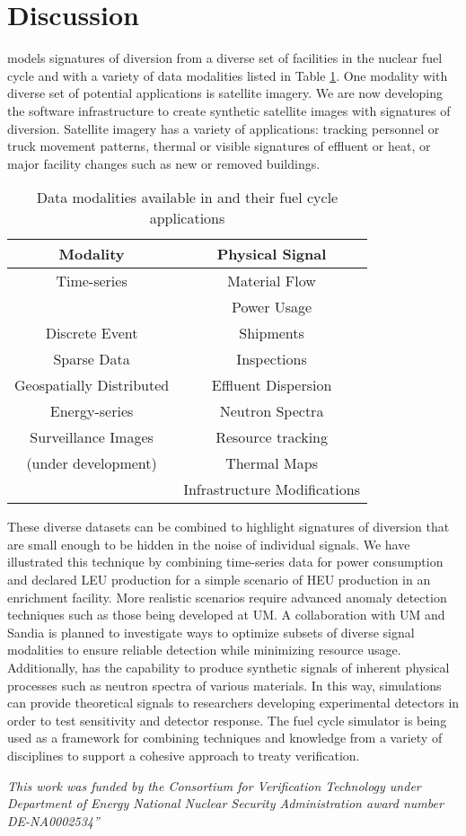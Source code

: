 \section{Discussion}
\label{s_dis}

\Cyclus models signatures of diversion from a diverse set of facilities in the nuclear fuel cycle and with a variety of data modalities listed in  Table \ref{tab:modalities}.  One modality with diverse set of potential applications is satellite imagery.  We are now developing the software infrastructure to create synthetic satellite images with signatures of diversion. Satellite imagery has a variety of applications: tracking personnel or truck movement patterns, thermal or visible signatures of effluent or heat, or major facility changes such as new or removed buildings.

\begin{table}
\centering
\begin{tabular}{|c|c|}
\hline
\textbf{Modality}        & \textbf{Physical Signal} \\
\hline
Time-series              & Material Flow \\
                         & Power Usage \\
\hline
Discrete Event           & Shipments \\
\hline
Sparse Data              & Inspections \\
\hline
Geospatially Distributed & Effluent Dispersion  \\
\hline
Energy-series            & Neutron Spectra \\
\hline
Surveillance Images      & Resource tracking \\
(under development)      & Thermal Maps  \\
                         & Infrastructure Modifications \\
\hline
\end{tabular}
\caption{Data modalities available in \Cyclus and their fuel cycle applications}
\label{tab:modalities}
\end{table}

These diverse datasets can be combined to highlight signatures of diversion that are small enough to be hidden in the noise of individual signals.  We have illustrated this technique by combining time-series data for power consumption and declared \gls{LEU} production for a simple scenario of \gls{HEU} production in an enrichment facility.  More realistic scenarios require advanced anomaly detection techniques such as those being developed at \gls{UM}. A collaboration with \gls{UM} and \gls{Sandia} is planned to investigate ways to optimize subsets of diverse signal modalities to ensure reliable detection while minimizing resource usage. Additionally, \Cyclus has the capability to produce synthetic signals of inherent physical processes such as neutron spectra of various materials.  In this way, \Cyclus simulations can provide theoretical signals to researchers developing experimental detectors in order to test sensitivity and detector response. The \Cyclus fuel cycle simulator is being used as a framework for combining techniques and knowledge from a variety of disciplines to support a cohesive approach to treaty verification. 


\textit{This work was funded by the Consortium for Verification Technology under Department of Energy National Nuclear Security Administration award number DE-NA0002534”}
